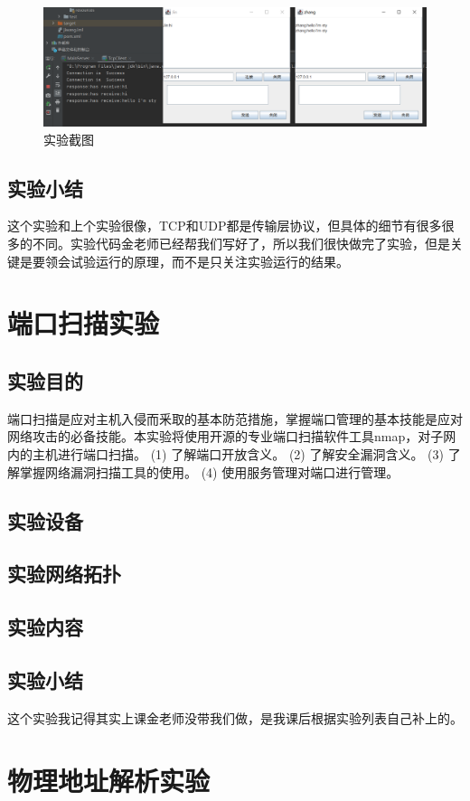 \documentclass[lang=cn,11pt,a4paper,cite=authoryear]{elegantpaper}
\begin{document}
\begin{figure}[htbp]
	\centering
	\includegraphics[width=0.8\linewidth]{image/screenshot007}
	\caption{实验截图}
	\label{fig:screenshot007}
\end{figure}


\subsection{实验小结}
这个实验和上个实验很像，TCP和UDP都是传输层协议，但具体的细节有很多很多的不同。实验代码金老师已经帮我们写好了，所以我们很快做完了实验，但是关键是要领会试验运行的原理，而不是只关注实验运行的结果。
\section{端口扫描实验}
\subsection{实验目的}
端口扫描是应对主机入侵而釆取的基本防范措施，掌握端口管理的基本技能是应对网络攻击的必备技能。本实验将使用开源的专业端口扫描软件工具nmap，对子网内的主机进行端口扫描。
(1)	了解端口开放含义。
(2)	了解安全漏洞含义。
(3)	了解掌握网络漏洞扫描工具的使用。
(4)	使用服务管理对端口进行管理。

\subsection{实验设备}
\subsection{实验网络拓扑}
\subsection{实验内容}
\subsection{实验小结}
这个实验我记得其实上课金老师没带我们做，是我课后根据实验列表自己补上的。
\section{物理地址解析实验}
\end{document}
